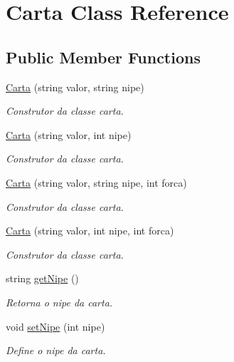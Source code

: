 \hypertarget{class_carta}{}\section{Carta Class Reference}
\label{class_carta}
\subsection*{Public Member Functions}
\begin{DoxyCompactItemize}
\item 
\mbox{\hyperlink{class_carta_ab40883af08945d0e13c94af2e74ab44e}{Carta}} (string valor, string nipe)
\begin{DoxyCompactList}\small\item\em Construtor da classe carta. \end{DoxyCompactList}\item 
\mbox{\hyperlink{class_carta_afd990c2a99bbe0e23dd6b39fd0b58aee}{Carta}} (string valor, int nipe)
\begin{DoxyCompactList}\small\item\em Construtor da classe carta. \end{DoxyCompactList}\item 
\mbox{\hyperlink{class_carta_a6f7d792f4b5f53f0580a02fafd0a436d}{Carta}} (string valor, string nipe, int forca)
\begin{DoxyCompactList}\small\item\em Construtor da classe carta. \end{DoxyCompactList}\item 
\mbox{\hyperlink{class_carta_a424b4351a7b118f5f0f9c00c4c3596f5}{Carta}} (string valor, int nipe, int forca)
\begin{DoxyCompactList}\small\item\em Construtor da classe carta. \end{DoxyCompactList}\item 
string \mbox{\hyperlink{class_carta_aec19b8852f1446c615b58e3284a76bc2}{get\+Nipe}} ()
\begin{DoxyCompactList}\small\item\em Retorna o nipe da carta. \end{DoxyCompactList}\item 
void \mbox{\hyperlink{class_carta_af3e357fb2a7b18ab435239a45e404ccd}{set\+Nipe}} (int nipe)
\begin{DoxyCompactList}\small\item\em Define o nipe da carta. \end{DoxyCompactList}\item 

\end{DoxyCompactItemize}

